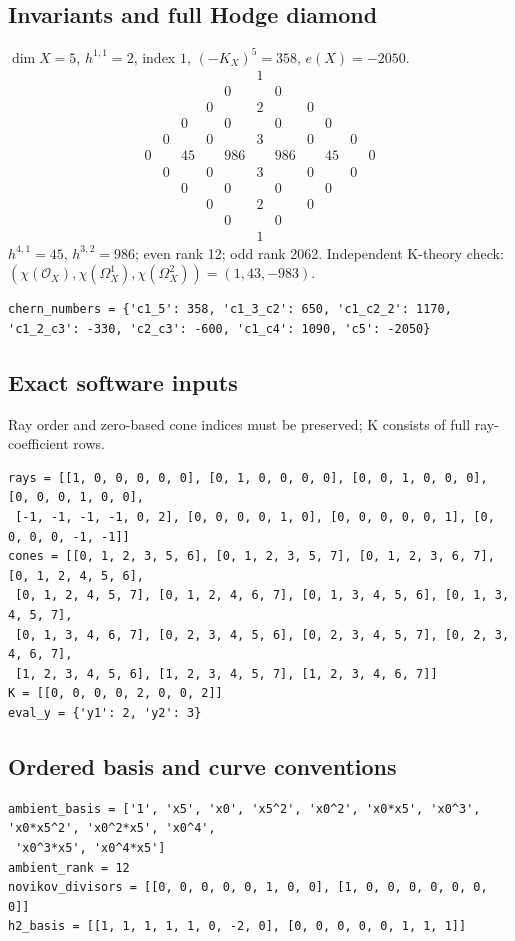 \documentclass[10pt,a4paper]{article}
\begin{document}
\subsection*{Invariants and full Hodge diamond}
$\dim X=5$, $h^{1,1}=2$, index $1$, $(-K_X)^5=358$, $e(X)=-2050$.
\[\begin{array}{ccccccccccc}&&&&&1&&&&&\\&&&&0&&0&&&&\\&&&0&&2&&0&&&\\&&0&&0&&0&&0&&\\&0&&0&&3&&0&&0&\\0&&45&&986&&986&&45&&0\\&0&&0&&3&&0&&0&\\&&0&&0&&0&&0&&\\&&&0&&2&&0&&&\\&&&&0&&0&&&&\\&&&&&1&&&&&\end{array}\]
$h^{4,1}=45$, $h^{3,2}=986$; even rank 12; odd rank 2062.
Independent K-theory check: $(\chi(\mathcal O_X),\chi(\Omega_X^1),\chi(\Omega_X^2))=(1, 43, -983)$.
\begin{lstlisting}
chern_numbers = {'c1_5': 358, 'c1_3_c2': 650, 'c1_c2_2': 1170, 'c1_2_c3': -330, 'c2_c3': -600, 'c1_c4': 1090, 'c5': -2050}
\end{lstlisting}
\subsection*{Exact software inputs}
Ray order and zero-based cone indices must be preserved; K consists of full ray-coefficient rows.
\begin{lstlisting}
rays = [[1, 0, 0, 0, 0, 0], [0, 1, 0, 0, 0, 0], [0, 0, 1, 0, 0, 0], [0, 0, 0, 1, 0, 0],
 [-1, -1, -1, -1, 0, 2], [0, 0, 0, 0, 1, 0], [0, 0, 0, 0, 0, 1], [0, 0, 0, 0, -1, -1]]
cones = [[0, 1, 2, 3, 5, 6], [0, 1, 2, 3, 5, 7], [0, 1, 2, 3, 6, 7], [0, 1, 2, 4, 5, 6],
 [0, 1, 2, 4, 5, 7], [0, 1, 2, 4, 6, 7], [0, 1, 3, 4, 5, 6], [0, 1, 3, 4, 5, 7],
 [0, 1, 3, 4, 6, 7], [0, 2, 3, 4, 5, 6], [0, 2, 3, 4, 5, 7], [0, 2, 3, 4, 6, 7],
 [1, 2, 3, 4, 5, 6], [1, 2, 3, 4, 5, 7], [1, 2, 3, 4, 6, 7]]
K = [[0, 0, 0, 0, 2, 0, 0, 2]]
eval_y = {'y1': 2, 'y2': 3}
\end{lstlisting}
\subsection*{Ordered basis and curve conventions}
\begin{lstlisting}
ambient_basis = ['1', 'x5', 'x0', 'x5^2', 'x0^2', 'x0*x5', 'x0^3', 'x0*x5^2', 'x0^2*x5', 'x0^4',
 'x0^3*x5', 'x0^4*x5']
ambient_rank = 12
novikov_divisors = [[0, 0, 0, 0, 0, 1, 0, 0], [1, 0, 0, 0, 0, 0, 0, 0]]
h2_basis = [[1, 1, 1, 1, 1, 0, -2, 0], [0, 0, 0, 0, 0, 1, 1, 1]]
\end{lstlisting}
\end{document}
